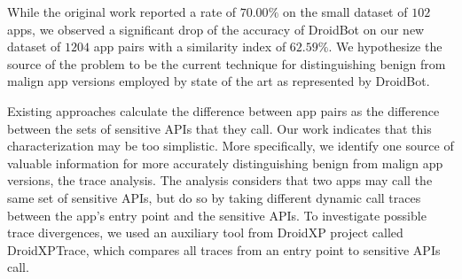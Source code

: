 
While the original work reported a rate of $70.00\%$ on the small dataset of $102$ apps, 
we observed a significant drop of the accuracy of DroidBot on our new dataset of $1204$ 
app pairs with a similarity index of $62.59\%$.
%
We hypothesize the source of the problem to be the current technique 
for distinguishing benign from malign app versions employed 
by state of the art as represented by
DroidBot. 

Existing approaches calculate the
difference between app pairs as
the difference between the sets of sensitive APIs 
that they call. Our work indicates that this characterization may be too simplistic.
More specifically, we identify one 
source of valuable information for more accurately
distinguishing benign from malign app versions, the trace analysis. The analysis considers that two apps may call the same set of sensitive APIs, but do so by taking different dynamic call traces between the app's entry point and the sensitive APIs. To investigate possible trace divergences, we used an auxiliary tool from DroidXP project called DroidXPTrace, which compares all traces from an entry point to sensitive APIs call.


